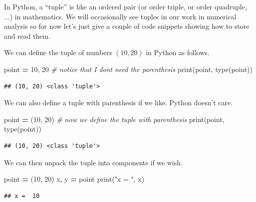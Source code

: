 \documentclass[
]{book}
\newenvironment{Shaded}{\begin{snugshade}}{\end{snugshade}}
\newcommand{\BuiltInTok}[1]{#1}
\newcommand{\CommentTok}[1]{\textcolor[rgb]{0.56,0.35,0.01}{\textit{#1}}}
\newcommand{\DecValTok}[1]{\textcolor[rgb]{0.00,0.00,0.81}{#1}}
\newcommand{\NormalTok}[1]{#1}
\newcommand{\OperatorTok}[1]{\textcolor[rgb]{0.81,0.36,0.00}{\textbf{#1}}}
\newcommand{\StringTok}[1]{\textcolor[rgb]{0.31,0.60,0.02}{#1}}
\theoremstyle{definition}
\theoremstyle{definition}
\theoremstyle{definition}
\theoremstyle{remark}
\begin{document}
In Python, a ``tuple'' is like an ordered pair (or order triple, or order quadruple, ...) in mathematics. We will occasionally see tuples in our work in numerical analysis so for now let's just give a couple of code snippets showing how to store and read them.

We can define the tuple of numbers \((10,20)\) in Python as follows.

\begin{Shaded}
\begin{Highlighting}[]
\NormalTok{point }\OperatorTok{=} \DecValTok{10}\NormalTok{, }\DecValTok{20} \CommentTok{\# notice that I don\textquotesingle{}t need the parenthesis}
\BuiltInTok{print}\NormalTok{(point, }\BuiltInTok{type}\NormalTok{(point))}
\end{Highlighting}
\end{Shaded}

\begin{verbatim}
## (10, 20) <class 'tuple'>
\end{verbatim}

We can also define a tuple with parenthesis if we like. Python doesn't care.

\begin{Shaded}
\begin{Highlighting}[]
\NormalTok{point }\OperatorTok{=}\NormalTok{ (}\DecValTok{10}\NormalTok{, }\DecValTok{20}\NormalTok{) }\CommentTok{\# now we define the tuple with parenthesis}
\BuiltInTok{print}\NormalTok{(point, }\BuiltInTok{type}\NormalTok{(point))}
\end{Highlighting}
\end{Shaded}

\begin{verbatim}
## (10, 20) <class 'tuple'>
\end{verbatim}

We can then unpack the tuple into components if we wish.

\begin{Shaded}
\begin{Highlighting}[]
\NormalTok{point }\OperatorTok{=}\NormalTok{ (}\DecValTok{10}\NormalTok{, }\DecValTok{20}\NormalTok{)}
\NormalTok{x, y }\OperatorTok{=}\NormalTok{ point}
\BuiltInTok{print}\NormalTok{(}\StringTok{"x = "}\NormalTok{, x)}
\end{Highlighting}
\end{Shaded}

\begin{verbatim}
## x =  10
\end{verbatim}
\end{document}
